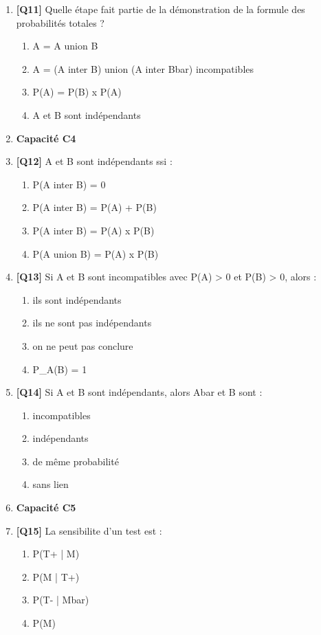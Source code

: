 \begin{enumerate}
\item \textbf{[Q11]} Quelle étape fait partie de la démonstration de la formule des probabilités totales ?
  \begin{enumerate}[label=\Alph*.]
    \item A = A union B
    \item A = (A inter B) union (A inter Bbar) incompatibles
    \item P(A) = P(B) x P(A)
    \item A et B sont indépendants
  \end{enumerate}

\item[] \textbf{Capacité C4}

\item \textbf{[Q12]} A et B sont indépendants ssi :
  \begin{enumerate}[label=\Alph*.]
    \item P(A inter B) = 0
    \item P(A inter B) = P(A) + P(B)
    \item P(A inter B) = P(A) x P(B)
    \item P(A union B) = P(A) x P(B)
  \end{enumerate}

\item \textbf{[Q13]} Si A et B sont incompatibles avec P(A) > 0 et P(B) > 0, alors :
  \begin{enumerate}[label=\Alph*.]
    \item ils sont indépendants
    \item ils ne sont pas indépendants
    \item on ne peut pas conclure
    \item P\_A(B) = 1
  \end{enumerate}

\item \textbf{[Q14]} Si A et B sont indépendants, alors Abar et B sont :
  \begin{enumerate}[label=\Alph*.]
    \item incompatibles
    \item indépendants
    \item de même probabilité
    \item sans lien
  \end{enumerate}

\item[] \textbf{Capacité C5}

\item \textbf{[Q15]} La sensibilite d'un test est :
  \begin{enumerate}[label=\Alph*.]
    \item P(T+ | M)
    \item P(M | T+)
    \item P(T- | Mbar)
    \item P(M)
  \end{enumerate}


\end{enumerate}
